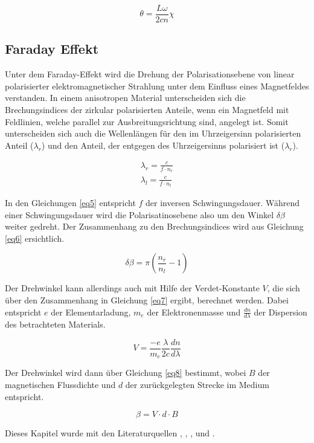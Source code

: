\begin{equation}
    \theta = \frac{L\omega}{2cn} \chi
    \label{eq4}
\end{equation}

\subsection{Faraday Effekt}
Unter dem Faraday-Effekt wird die Drehung der Polarisationsebene von linear 
polarisierter
elektromagnetischer Strahlung unter dem Einfluss eines Magnetfeldes verstanden.
In einem anisotropen Material unterscheiden sich die Brechungsindices der 
zirkular polarisierten Anteile, wenn ein Magnetfeld mit Feldlinien, welche 
parallel zur Ausbreitungsrichtung sind, angelegt ist. Somit 
unterscheiden sich auch die Wellenlängen für den im Uhrzeigersinn polarisierten 
Anteil ($\lambda_{r}$) und den Anteil, der entgegen des Uhrzeigersinns polarisiert 
ist ($\lambda_{r}$).

\begin{align}
    \lambda_{r} = \frac{c}{f\cdot n_{r}}\\
    \lambda_{l} = \frac{c}{f\cdot n_{l}}
    \label{eq5}
\end{align}

In den Gleichungen \ref{eq5} entspricht $f$ der inversen Schwingungsdauer.
Während einer Schwingungsdauer wird die Polarisatinosebene also um den Winkel 
$\delta \beta$ weiter gedreht. Der Zusammenhang zu den Brechungsindices wird aus 
Gleichung \ref{eq6} ersichtlich.

\begin{equation}
    \delta \beta = \pi \left( \frac{n_r}{n_l} -1 \right)
    \label{eq6}
\end{equation}

Der Drehwinkel kann allerdings auch mit Hilfe der Verdet-Konstante $V$, die sich 
über den Zusammenhang in Gleichung \ref{eq7} ergibt, berechnet werden.
Dabei entspricht $e$ der Elementarladung, $m_e$ der Elektronenmasse und 
$\frac{dn}{d\lambda}$ der 
Dispersion des betrachteten Materials.

\begin{equation}
    V = \frac{-e}{m_e} \frac{\lambda}{2c} \frac{dn}{d\lambda}
    \label{eq7}
\end{equation}

Der Drehwinkel wird dann über Gleichung \ref{eq8} bestimmt, wobei 
$B$ der magnetischen Flussdichte und $d$ der zurückgelegten Strecke 
im Medium entspricht.

\begin{equation}
    \beta = V \cdot d \cdot B
    \label{eq8}
\end{equation}

Dieses Kapitel wurde mit den Literaturquellen
\cite{sample}, \cite{demt}, \cite{exp}, \cite{switch} und \cite{eng}.

